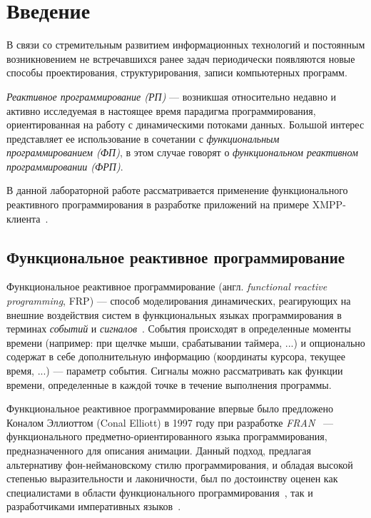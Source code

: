 \section*{Введение}
В связи со стремительным развитием информационных технологий и постоянным возникновением
не встречавшихся ранее задач периодически появляются новые способы проектирования, структурирования,
записи компьютерных программ.

\emph{Реактивное программирование (РП)} — возникшая относительно
недавно и активно исследуемая в настоящее время парадигма программирования, ориентированная
на работу с динамическими потоками данных. Большой интерес представляет ее использование
в сочетании с \emph{функциональным программированием (ФП)}, в этом случае говорят о
\emph{функциональном реактивном программировании (ФРП)}.

В данной лабораторной работе рассматривается применение функционального реактивного программирования
в разработке приложений на примере XMPP-клиента~\cite{xmpp}.

\subsection*{Функциональное реактивное программирование}
Функциональное реактивное программирование (англ. \emph{functional reactive programming}, FRP)
--- способ моделирования динамических, реагирующих на внешние воздействия систем
в функциональных языках программирования в терминах \emph{событий} и \emph{сигналов}~\cite{amsdensurvey}.
События происходят в определенные моменты времени (например: при щелчке мыши, срабатывании таймера, ...)
и опционально содержат в себе дополнительную информацию (координаты курсора, текущее время, ...) — параметр события.
Сигналы можно рассматривать как функции времени, определенные в каждой точке в течение выполнения программы.

Функциональное реактивное программирование впервые было предложено Коналом Эллиоттом (Conal Elliott)
в 1997 году при разработке \emph{FRAN}~\cite{fran} --- функционального предметно-ориентированного языка программирования,
предназначенного для описания анимации.
Данный подход, предлагая альтернативу фон-неймановскому стилю программирования, и обладая
высокой степенью выразительности и лаконичности, был по достоинству оценен как
специалистами в области функционального программирования~\cite{modsynth,robotics},
так и разработчиками императивных языков~\cite{csrx}.
